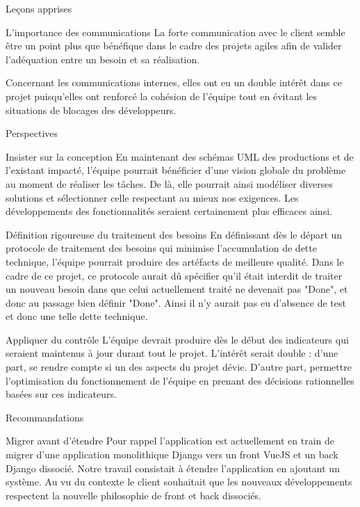 \documentclass[]{article}
\begin{document}
{\begin{section}{Leçons apprises}
 \begin{subsection}{L'importance des communications}
     La forte communication avec le client semble être un point plus que bénéfique dans le cadre des projets agiles afin de valider l'adéquation entre un besoin et sa réalisation. 

     Concernant les communications internes, elles ont eu un double intérêt dans ce projet puisqu'elles ont renforcé la cohésion de l'équipe tout en évitant les situations de blocages des développeurs.
 \end{subsection}
\end{section}

\begin{section}{Perspectives}
 \begin{subsection}{Insister sur la conception}
     En maintenant des schémas UML des productions et de l'existant impacté, l'équipe pourrait bénéficier d'une vision globale du problème au moment de réaliser les tâches. De là, elle pourrait ainsi modéliser diverses solutions et sélectionner celle respectant au mieux nos exigences. Les développements des fonctionnalités seraient certainement plus efficaces ainsi.
 \end{subsection}

 \begin{subsection}{Définition rigoureuse du traitement des besoins}
     En définissant dès le départ un protocole de traitement des besoins qui minimise l'accumulation de dette technique, l'équipe pourrait produire des artéfacts de meilleure qualité. Dans le cadre de ce projet, ce protocole aurait dû spécifier qu'il était interdit de traiter un nouveau besoin dans que celui actuellement traité ne devenait pas "Done", et donc au passage bien définir "Done". Ainsi il n'y aurait pas eu d'absence de test et donc une telle dette technique.
 \end{subsection}

 \begin{subsection}{Appliquer du contrôle}
     L'équipe devrait produire dès le début des indicateurs qui seraient maintenus à jour durant tout le projet. L'intérêt serait double : d'une part, se rendre compte si un des aspects du projet dévie. D'autre part, permettre l'optimisation du fonctionnement de l'équipe en prenant des décisions rationnelles basées sur ces indicateurs.
 \end{subsection}
\end{section}

\begin{section}{Recommandations}
 \begin{subsection}{Migrer avant d'étendre}
     Pour rappel l'application est actuellement en train de migrer d'une application monolithique Django vers un front VueJS et un back Django dissocié. Notre travail consistait à étendre l'application en ajoutant un système. Au vu du contexte le client souhaitait que les nouveaux développements respectent la nouvelle philosophie de front et back dissociés.


\end{subsection}
\end{section}}
\end{document}
